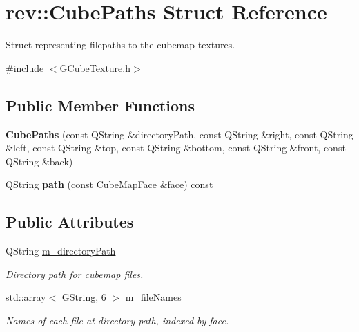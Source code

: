 \hypertarget{structrev_1_1_cube_paths}{}\section{rev\+::Cube\+Paths Struct Reference}
\label{structrev_1_1_cube_paths}


Struct representing filepaths to the cubemap textures.  




{\ttfamily \#include $<$G\+Cube\+Texture.\+h$>$}

\subsection*{Public Member Functions}
\begin{DoxyCompactItemize}
\item 
\mbox{\label{structrev_1_1_cube_paths_a45b6aedd6371bfa298a040aca22b82b6}} 
{\bfseries Cube\+Paths} (const Q\+String \&directory\+Path, const Q\+String \&right, const Q\+String \&left, const Q\+String \&top, const Q\+String \&bottom, const Q\+String \&front, const Q\+String \&back)
\item 
\mbox{\label{structrev_1_1_cube_paths_a09959a7062ec917641c50c7f4d5e8744}} 
Q\+String {\bfseries path} (const Cube\+Map\+Face \&face) const
\end{DoxyCompactItemize}
\subsection*{Public Attributes}
\begin{DoxyCompactItemize}
\item 
\mbox{\label{structrev_1_1_cube_paths_af4623b17f58b5f5a6251d6933f717513}} 
Q\+String \mbox{\hyperlink{structrev_1_1_cube_paths_af4623b17f58b5f5a6251d6933f717513}{m\+\_\+directory\+Path}}
\begin{DoxyCompactList}\small\item\em Directory path for cubemap files. \end{DoxyCompactList}\item 
\mbox{\label{structrev_1_1_cube_paths_a9177fa3ee904d75c4aa23e78743a380d}} 
std\+::array$<$ \mbox{\hyperlink{classrev_1_1_g_string}{G\+String}}, 6 $>$ \mbox{\hyperlink{structrev_1_1_cube_paths_a9177fa3ee904d75c4aa23e78743a380d}{m\+\_\+file\+Names}}
\begin{DoxyCompactList}\small\item\em Names of each file at directory path, indexed by face. \end{DoxyCompactList}\end{DoxyCompactItemize}


